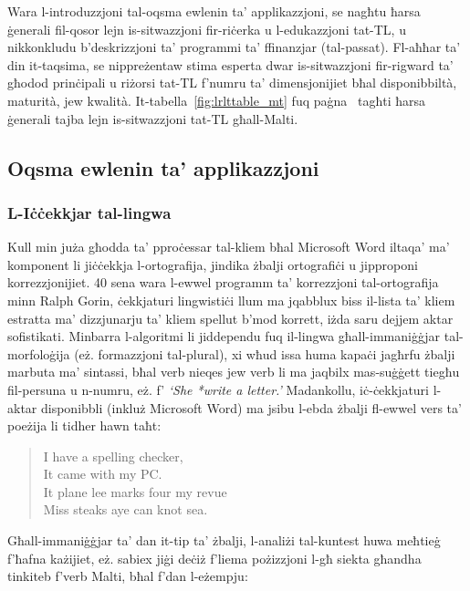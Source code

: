 \documentclass[]{../../metanetpaper}
\begin{document}
\begin{multicols}{2}
Wara l-introduzzjoni tal-oqsma ewlenin ta’ applikazzjoni, se nagħtu ħarsa ġenerali fil-qosor lejn is-sitwazzjoni fir-riċerka u l-edukazzjoni tat-TL, u nikkonkludu b’deskrizzjoni ta’ programmi ta’ ffinanzjar (tal-passat). Fl-aħħar ta’ din it-taqsima, se nippreżentaw stima esperta dwar is-sitwazzjoni fir-rigward ta’ għodod prinċipali u riżorsi tat-TL f’numru ta’ dimensjonijiet bħal disponibbiltà, maturità, jew kwalità. It-tabella~\ref{fig:lrlttable_mt} fuq paġna~\pageref{fig:lrlttable_mt} tagħti ħarsa ġenerali tajba lejn is-sitwazzjoni tat-TL għall-Malti.

\subsection{Oqsma ewlenin ta’ applikazzjoni} 

\subsubsection{L-Iċċekkjar tal-lingwa}

Kull min juża għodda ta’ pproċessar tal-kliem bħal Microsoft Word iltaqa’ ma’ komponent li jiċċekkja l-ortografija, jindika żbalji ortografiċi u jipproponi korrezzjonijiet. 40 sena wara l-ewwel programm ta’ korrezzjoni tal-ortografija minn Ralph Gorin, ċekkjaturi lingwistiċi llum ma jqabblux biss il-lista ta’ kliem estratta ma’ dizzjunarju ta’ kliem spellut b’mod korrett, iżda saru dejjem aktar sofistikati. Minbarra l-algoritmi li jiddependu fuq il-lingwa għall-immaniġġjar tal-morfoloġija (eż. formazzjoni tal-plural), xi wħud issa huma kapaċi jagħrfu żbalji marbuta ma’ sintassi, bħal verb nieqes jew verb li ma jaqbilx mas-suġġett tiegħu fil-persuna u n-numru, eż. f’ \emph{`She *write a letter.’} Madankollu, iċ-ċekkjaturi l-aktar disponibbli (inkluż Microsoft Word) ma jsibu l-ebda żbalji fl-ewwel vers ta’ poeżija \cite{zar1} %
li tidher hawn taħt:

\begin{quote}
  I have a spelling checker,\\
  It came with my PC.\\
  It plane lee marks four my revue\\
  Miss steaks aye can knot sea.
\end{quote}

Għall-immaniġġjar ta’ dan it-tip ta’ żbalji, l-analiżi tal-kuntest huwa meħtieġ f'ħafna każijiet, eż. sabiex jiġi deċiż f'liema pożizzjoni l-għ siekta għandha tinkiteb f’verb Malti, bħal f’dan l-eżempju:


\end{multicols}
\end{document}

